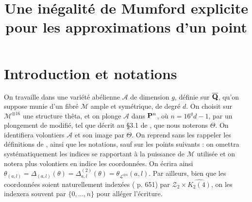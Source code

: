 

\usepackage{csquotes}
\usepackage[style=alphabetic, sorting=nyt, sortcites=true,
  autopunct=true, babel=hyphen,
  hyperref=true, backref=false]{biblatex}


\newtheorem{thm}{Théorème}
\newtheorem{prop}[thm]{Proposition}
\newtheorem{lem}[thm]{Lemme}
\newtheorem{coro}[thm]{Corollaire}

\newcommand{\av}[2][v]{\left\lvert#2\right\rvert_{#1}}
\newcommand{\nv}[2][v]{\left\lVert#2\right\rVert_{#1}}
\newcommand{\nnv}[2][v]{%
  \left\lvert\hspace{-1pt}%
  \left\lvert\hspace{-1pt}%
  \left\lvert#2\right\rvert%
  \hspace{-1pt}\right\rvert%
  \hspace{-1pt}\right\rvert_{#1}}
\newcommand{\nvp}[2][v]{\|#2\|_{#1}}
\newcommand{\dv}{{\delta_v}}
\newcommand{\Dv}{\mathrm{dist}_v}
\newcommand{\A}{\mathcal{A}}
\newcommand{\p}[1]{{\boldsymbol{#1}}}
\newcommand{\OA}{\p{0}}
\newcommand{\coa}{\theta}
\newcommand{\BA}{\mathfrak{B}}
\newcommand{\hn}{\hat{h}}
\newcommand{\lgr}[1]{{|#1|}}
\newcommand{\vlg}[1]{\lgr #1}

\title{Une inégalité de Mumford explicite\\
  pour les approximations d'un point}



\maketitle

\section*{Introduction et notations}

On travaille dans une variété abélienne $\A$ de dimension $g$, définie sur
$\overline{\mathbf{Q}}$, qu'on suppose munie d'un fibré $\mathcal{M}$ ample et symétrique, de
degré $d$. On choisit sur $\mathcal{M}^{\otimes 16}$ une structure thêta, et
on plonge $\A$ dans $\mathbf{P}^n$, où $n=16^g d - 1$, par un plongement de
 modifié, tel que décrit au §3.1 de \cite{daphiminvaii}, que nous
noterons $\Theta$. On identifiera volontiers $\A$ et son image par $\Theta$.
On reprend sans les rappeler les définitions de , ainsi que les
notations, sauf sur les points suivants : on omettra systématiquement les
indices se rapportant à la puissance de $\mathcal{M}$ utilisée et on notera
plus volontiers en indice les coordonnées. On écrira ainsi $\coa_{(a, l)} =
\Delta_{(a, l)}(\coa)  = \Delta_{a, l}^{(2)}(\coa) =
\coa_{\mathcal{L}^{\otimes 4}}(a, l)$. Par ailleurs, bien que les coordonnées
soient naturellement indexées ( p. 651) par $\mathcal{Z}_2 \times
\widehat{K_2(4)}$, on les indexera souvent par $\{0, \dots, n\}$ pour alléger
l'écriture.

